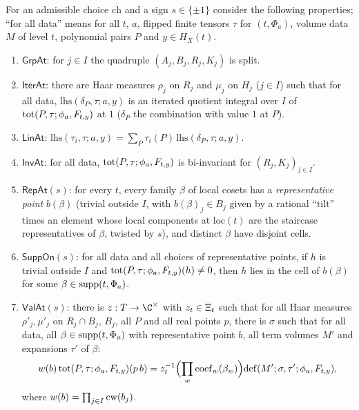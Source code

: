 \begin{definition}\label{def:pf:rowprops:unfprops}
For an admissible choice $\mathrm{ch}$ and a sign $s\in\{\pm1\}$ consider the following properties; ``for all data'' means
for all $t$, $a$, flipped finite tensors $\tau$ for $(t,\Phi_a)$, volume data $M$ of level $t$, polynomial pairs $P$ and
$y\in H_X(t)$.
\begin{enumerate}[label=(\alph*)]
\item $\mathsf{GrpAt}$: for $j\in I$ the quadruple $(A_j,B_j,R_j,K_j)$ is split.
\item $\mathsf{IterAt}$: there are Haar measures $\rho_j$ on $R_j$ and $\mu_j$ on $H_j$ ($j\in I$) such that for all data,
$\mathrm{lhs}(\delta_P,\tau;a,y)$ is an iterated quotient integral over $I$ of $\mathrm{tot}(P,\tau;\phi_a,F_{t,y})$ at $1$
($\delta_P$ the combination with value $1$ at $P$).
\item $\mathsf{LinAt}$: $\mathrm{lhs}(\tau_i,\tau;a,y)=\sum_P\tau_i(P)\,\mathrm{lhs}(\delta_P,\tau;a,y)$.
\item $\mathsf{InvAt}$: for all data, $\mathrm{tot}(P,\tau;\phi_a,F_{t,y})$ is bi-invariant for $(R_j,K_j)_{j\in I}$.
\item $\mathsf{RepAt}(s)$: for every $t$, every family $\beta$ of local cosets has a \emph{representative point} $b(\beta)$
(trivial outside $I$, with $b(\beta)_j\in B_j$ given by a rational ``tilt'' times an element whose local components at
$\mathrm{loc}(t)$ are the staircase representatives of $\beta$, twisted by $s$), and distinct $\beta$ have disjoint cells.
\item $\mathsf{SuppOn}(s)$: for all data and all choices of representative points, if $h$ is trivial outside $I$ and
$\mathrm{tot}(P,\tau;\phi_a,F_{t,y})(h)\ne0$, then $h$ lies in the cell of $b(\beta)$ for some
$\beta\in\mathrm{supp}(t,\Phi_a)$.
\item $\mathsf{ValAt}(s)$: there is $z:T\to\C^\times$ with $z_t\in\Xi_t$ such that for all Haar measures
$\rho'_j,\mu'_j$ on $R_j\cap B_j$, $B_j$, all $P$ and all real points $p$, there is $\sigma$ such that for all data, all
$\beta\in\mathrm{supp}(t,\Phi_a)$ with representative point $b$, all term volumes $M'$ and expansions $\tau'$ of $\beta$:
\begin{equation}\label{eq:pf:rowprops:valat}
w(b)\,\mathrm{tot}(P,\tau;\phi_a,F_{t,y})(p\,b)=z_t^{-1}\Bigl(\prod_w\mathrm{coef}_w(\beta_w)\Bigr)\mathrm{def}(M';\sigma,\tau';\phi_a,F_{t,y}),
\end{equation}
where $w(b)=\prod_{j\in I}\mathrm{cw}(b_j)$.

\end{enumerate}
\end{definition}
